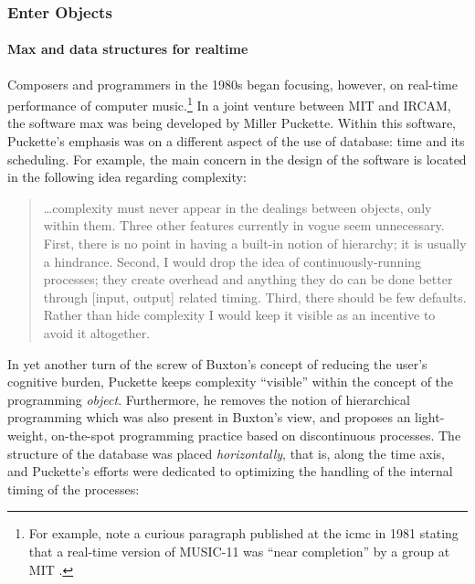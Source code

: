 \subsubsection{Enter Objects}

	\paragraph{Max and data structures for realtime}
	\label{computer:realtime}

	Composers and programmers in the 1980s began focusing, however, on real-time performance of computer music.\footnote{For example, note a curious paragraph published at the \gls{icmc} in 1981 stating that a real-time version of MUSIC-11 was ``near completion'' by a group at MIT \parencite{DBLP:conf/icmc/PucketteVS81}.} In a joint venture between MIT and IRCAM, the software \gls{max} was being developed by Miller Puckette. Within this software, Puckette's emphasis was on a different aspect of the use of database: time and its scheduling. For example, the main concern in the design of the software is located in the following idea regarding complexity:

	\begin{quote}
		\dots complexity must never appear in the dealings between objects, only within them. Three other features currently in vogue seem unnecessary. First, there is no point in having a built-in notion of hierarchy; it is usually a hindrance. Second, I would drop the idea of continuously-running processes; they create overhead and anything they do can be done better through [input, output] related timing. Third, there should be few defaults. Rather than hide complexity I would keep it visible as an incentive to avoid it altogether. \parencite[43]{DBLP:conf/icmc/Puckette86}
	\end{quote}

	In yet another turn of the screw of Buxton's concept of reducing the user's cognitive burden, Puckette keeps complexity ``visible'' within the concept of the programming \textit{object}. Furthermore, he removes the notion of hierarchical programming which was also present in Buxton's view, and proposes an light-weight, on-the-spot programming practice based on discontinuous processes. The structure of the database was placed \textit{horizontally}, that is, along the time axis, and Puckette's efforts were dedicated to optimizing the handling of the internal timing of the processes:

